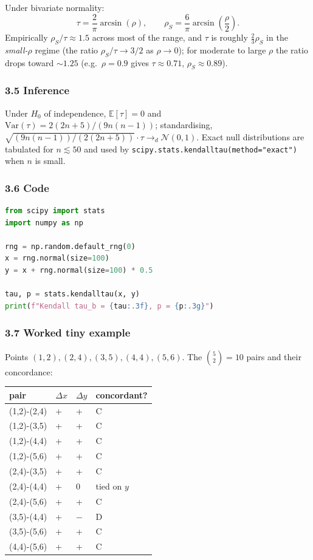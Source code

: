\documentclass{article}
\begin{document}
Under bivariate normality: \[
\tau = \frac{2}{\pi} \arcsin(\rho), \qquad \rho_S = \frac{6}{\pi} \arcsin\!\left(\frac{\rho}{2}\right).
\] Empirically \(\rho_S / \tau \approx 1.5\) across most of the range,
and \(\tau\) is roughly \(\tfrac{2}{3} \rho_S\) in the \emph{small-\(\rho\)} regime
(the ratio \(\rho_S/\tau \to 3/2\) as \(\rho \to 0\)); for moderate to large \(\rho\)
the ratio drops toward \(\sim 1.25\) (e.g.\ \(\rho = 0.9\) gives \(\tau \approx 0.71\),
\(\rho_S \approx 0.89\)).

\subsubsection{3.5 Inference}\label{35-inference}

Under \(H_0\) of independence, \(\mathbb{E}[\tau] = 0\) and
\(\mathrm{Var}(\tau) = 2(2n + 5)/(9n(n-1))\); standardising,
\(\sqrt{(9n(n-1))/(2(2n+5))} \cdot \tau \to_d \mathcal{N}(0, 1)\). Exact
null distributions are tabulated for \(n \lesssim 50\) and used by
\texttt{scipy.stats.kendalltau(method="exact")} when \(n\) is small.

\subsubsection{3.6 Code}\label{36-code}

\begin{lstlisting}[language=Python]
from scipy import stats
import numpy as np

rng = np.random.default_rng(0)
x = rng.normal(size=100)
y = x + rng.normal(size=100) * 0.5

tau, p = stats.kendalltau(x, y)
print(f"Kendall tau_b = {tau:.3f}, p = {p:.3g}")
\end{lstlisting}

\subsubsection{3.7 Worked tiny example}\label{37-worked-tiny-example}

Points \((1, 2), (2, 4), (3, 5), (4, 4), (5, 6)\). The
\(\binom{5}{2} = 10\) pairs and their concordance:

{\def\LTcaptype{none} %
\begin{longtable}[]{@{}llll@{}}
\toprule\noalign{}
pair & \(\Delta x\) & \(\Delta y\) & concordant? \\
\midrule\noalign{}
\endhead
\bottomrule\noalign{}
\endlastfoot
(1,2)-(2,4) & + & + & C \\
(1,2)-(3,5) & + & + & C \\
(1,2)-(4,4) & + & + & C \\
(1,2)-(5,6) & + & + & C \\
(2,4)-(3,5) & + & + & C \\
(2,4)-(4,4) & + & 0 & tied on \(y\) \\
(2,4)-(5,6) & + & + & C \\
(3,5)-(4,4) & + & − & D \\
(3,5)-(5,6) & + & + & C \\
(4,4)-(5,6) & + & + & C \\
\end{longtable}
}
\end{document}
